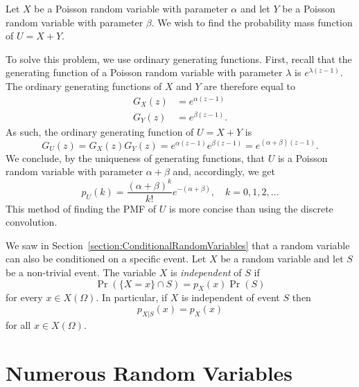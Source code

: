 \begin{example}
Let $X$ be a Poisson random variable with parameter $\alpha$ and let $Y$ be a Poisson random variable with parameter $\beta$.
We wish to find the probability mass function of $U = X + Y$.

To solve this problem, we use ordinary generating functions.
First, recall that the generating function of a Poisson random variable with parameter $\lambda$ is $e^{\lambda (z-1)}$.
The ordinary generating functions of $X$ and $Y$ are therefore equal to
\begin{align*}
G_X (z) &= e^{\alpha (z-1)} \\
G_Y (z) &= e^{\beta (z-1)} .
\end{align*}
As such, the ordinary generating function of $U = X + Y$ is
\begin{equation*}
G_U (z) = G_X (z) G_Y(z) = e^{\alpha (z-1)} e^{\beta (z-1)}
= e^{(\alpha + \beta) (z-1)} .
\end{equation*}
We conclude, by the uniqueness of generating functions, that $U$ is a Poisson random variable with parameter $\alpha + \beta$ and, accordingly, we get
\begin{equation*}
p_U (k) = \frac{ (\alpha + \beta)^k }{k!} e^{- (\alpha + \beta) },
\quad k = 0, 1, 2, \ldots
\end{equation*}
This method of finding the PMF of $U$ is more concise than using the discrete convolution.
\end{example}

We saw in Section~\ref{section:ConditionalRandomVariables} that a random variable can also be conditioned on a specific event.
Let $X$ be a random variable and let $S$ be a non-trivial event.
The variable $X$ is \emph{independent} of $S$ if
\begin{equation*}
\Pr (\{X = x \} \cap S ) = p_X (x) \Pr (S)
\end{equation*}
for every $x \in X(\Omega)$.
In particular, if $X$ is independent of event $S$ then
\begin{equation*}
p_{X|S} (x) = p_X (x)
\end{equation*}
for all $x \in X(\Omega)$.


\section{Numerous Random Variables}

